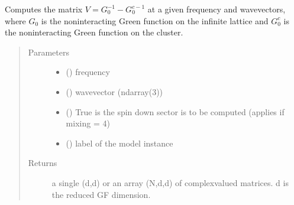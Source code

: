 \documentclass[letterpaper,10pt,english]{sphinxmanual}
\begin{document}

\begin{fulllineitems}
\label{\detokenize{functions:pyqcm.TooManyIterationsError}}
\end{fulllineitems}


\begin{fulllineitems}
\label{\detokenize{functions:pyqcm.V_matrix}}
\sphinxAtStartPar
Computes the matrix \(V=G_0^{-1}-G^{c-1}_0\) at a given frequency and wavevectors, where \(G_0\) is the noninteracting Green function on the infinite lattice and \(G^c_0\) is the noninteracting Green function on the cluster.
\begin{quote}\begin{description}
\item[{Parameters}] \leavevmode\begin{itemize}
\item {} 
\sphinxAtStartPar
{} () \textendash{} frequency

\item {} 
\sphinxAtStartPar
{} () \textendash{} wavevector (ndarray(3))

\item {} 
\sphinxAtStartPar
{} () \textendash{} True is the spin down sector is to be computed (applies if mixing = 4)

\item {} 
\sphinxAtStartPar
{} () \textendash{} label of the model instance

\end{itemize}

\item[{Returns}] \leavevmode
\sphinxAtStartPar
a single (d,d) or an array (N,d,d) of complex\sphinxhyphen{}valued matrices. d is the reduced GF dimension.

\end{description}\end{quote}

\end{fulllineitems}
\end{document}
